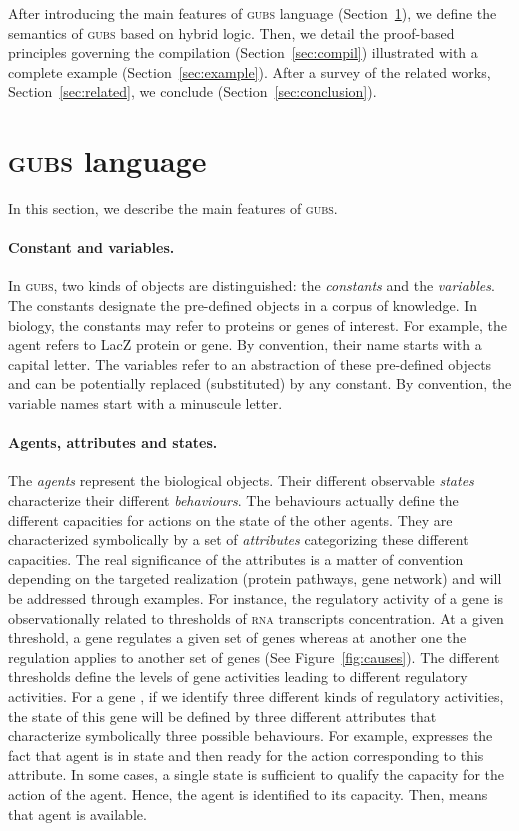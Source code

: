 \documentclass{eptcs}
\newcommand{\eg}[0]{\abbrev{\textit{e.g.}}}
\newcounter{ti}
\begin{document}
After introducing the main features of \textsc{gubs} language (Section~\ref{sec:gubs}), we define the semantics of \textsc{gubs} based on hybrid logic. Then, we detail the proof-based principles governing the compilation (Section~\ref{sec:compil}) illustrated with a complete example (Section~\ref{sec:example}). After a survey of the related works, Section~\ref{sec:related}, we conclude (Section~\ref{sec:conclusion}). 


\section{\textsc{gubs} language}
\label{sec:gubs}
\newcommand{\context}[1]{[#1]}

In this section, we describe the main features of \textsc{gubs}. 
\paragraph{Constant and variables.} In \textsc{gubs}, two kinds of objects are distinguished: the \emph{constants} and the \emph{variables}. The constants designate the pre-defined objects in a corpus of knowledge. In biology, the constants may refer to proteins or genes of interest. For example, the agent  refers to LacZ protein or gene. By convention, their name starts with a capital letter. The variables refer to an abstraction of these pre-defined objects and can be potentially replaced (substituted) by any constant. By convention, the variable names start with a minuscule letter.
\paragraph{Agents, attributes and states.}
The \emph{agents} represent the biological objects. Their different observable \emph{states} characterize their different \emph{behaviours}. The behaviours actually define the different capacities for actions on the state of the other agents. They are characterized symbolically by a set of \emph{attributes} categorizing these different capacities. The real significance of the attributes is a matter of convention depending on the targeted realization (\eg protein pathways, gene network) and will be addressed through examples. 
For instance, the regulatory activity of a gene is observationally related to thresholds of \textsc{rna} transcripts concentration. At a given threshold, a gene regulates a given set of genes whereas at another one the regulation applies to another set of genes (See Figure~\ref{fig:causes}). The different thresholds define the levels of gene activities leading to different regulatory activities.
For a gene , if we identify three different kinds of regulatory activities, the state of this gene will be defined by three different attributes  that characterize symbolically three possible behaviours. 
For example,  expresses the fact that agent  is in state  and then ready for the action corresponding to this attribute. In some cases, a single state is sufficient to qualify the capacity for the action of the agent. Hence, the agent is identified to its capacity. Then,  means that agent  is available. 
\end{document}
